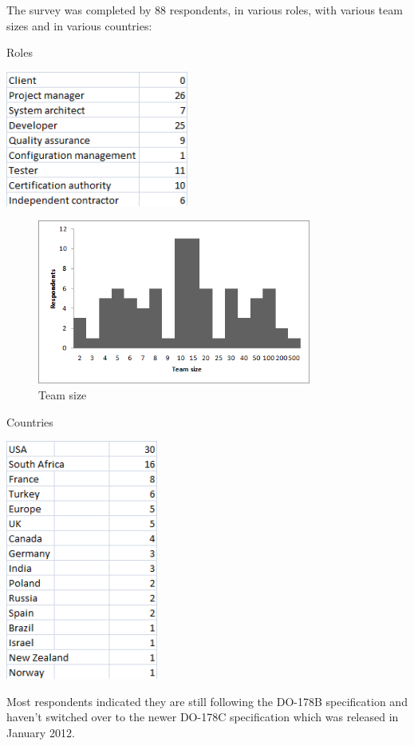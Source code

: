 \documentclass{sig-alternate-05-2015}
\begin{document}
The survey was completed by 88 respondents, in various roles, with various team sizes and in various countries:
\begin{table}[t!]
	\centering
	\caption{Roles}
	\includegraphics[width=60mm]{Roles.png}
\end{table}

\begin{figure}[t!]
	\centering
	\includegraphics[width=90mm]{Teams.png}
	\caption{Team size}
\end{figure}

\begin{table}[t!]
	\centering
	\caption{Countries}
	\includegraphics[width=50mm]{Countries.png}
\end{table}

Most respondents indicated they are still following the DO-178B specification and haven't switched over to the newer DO-178C specification which was released in January 2012.
\end{document}
